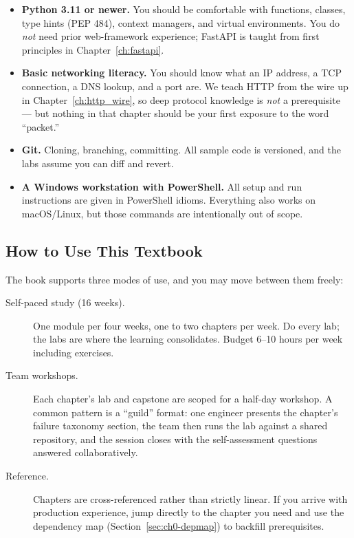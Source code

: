 \begin{itemize}
  \item \textbf{Python 3.11 or newer.} You should be comfortable with
        functions, classes, type hints (PEP 484), context managers, and
        virtual environments. You do \emph{not} need prior web-framework
        experience; FastAPI is taught from first principles in
        Chapter~\ref{ch:fastapi}.
  \item \textbf{Basic networking literacy.} You should know what an IP
        address, a TCP connection, a DNS lookup, and a port are. We teach
        HTTP from the wire up in Chapter~\ref{ch:http_wire}, so deep protocol
        knowledge is \emph{not} a prerequisite --- but nothing in that
        chapter should be your first exposure to the word ``packet.''
  \item \textbf{Git.} Cloning, branching, committing. All sample code is
        versioned, and the labs assume you can diff and revert.
  \item \textbf{A Windows workstation with PowerShell.} All setup and run
        instructions are given in PowerShell idioms. Everything also works on
        macOS/Linux, but those commands are intentionally out of scope.
\end{itemize}

\subsection{How to Use This Textbook}

The book supports three modes of use, and you may move between them freely:

\begin{description}
  \item[Self-paced study (16 weeks).] One module per four weeks, one to two
    chapters per week. Do every lab; the labs are where the learning
    consolidates. Budget 6--10 hours per week including exercises.
  \item[Team workshops.] Each chapter's lab and capstone are scoped for a
    half-day workshop. A common pattern is a ``guild'' format: one engineer
    presents the chapter's failure taxonomy section, the team then runs the
    lab against a shared repository, and the session closes with the
    self-assessment questions answered collaboratively.
  \item[Reference.] Chapters are cross-referenced rather than strictly
    linear. If you arrive with production experience, jump directly to the
    chapter you need and use the dependency map
    (Section~\ref{sec:ch0-depmap}) to backfill prerequisites.
\end{description}

